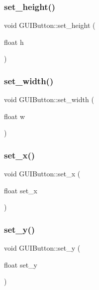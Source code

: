 \subsubsection{\texorpdfstring{set\+\_\+height()}{set\_height()}}
{\footnotesize\ttfamily void G\+U\+I\+Button\+::set\+\_\+height (\begin{DoxyParamCaption}\item[{float}]{h }\end{DoxyParamCaption})}

\hypertarget{class_g_u_i_button_ad712ea7ed6202c5916036d8f1e1a4460}{}\label{class_g_u_i_button_ad712ea7ed6202c5916036d8f1e1a4460} 
\subsubsection{\texorpdfstring{set\+\_\+width()}{set\_width()}}
{\footnotesize\ttfamily void G\+U\+I\+Button\+::set\+\_\+width (\begin{DoxyParamCaption}\item[{float}]{w }\end{DoxyParamCaption})}

\hypertarget{class_g_u_i_button_aba6aaca7c6c5b3b7747a7afd6750814e}{}\label{class_g_u_i_button_aba6aaca7c6c5b3b7747a7afd6750814e} 
\subsubsection{\texorpdfstring{set\+\_\+x()}{set\_x()}}
{\footnotesize\ttfamily void G\+U\+I\+Button\+::set\+\_\+x (\begin{DoxyParamCaption}\item[{float}]{set\+\_\+x }\end{DoxyParamCaption})}

\hypertarget{class_g_u_i_button_a80cdf26f1a5ab63b0d6f84145fe60411}{}\label{class_g_u_i_button_a80cdf26f1a5ab63b0d6f84145fe60411} 
\subsubsection{\texorpdfstring{set\+\_\+y()}{set\_y()}}
{\footnotesize\ttfamily void G\+U\+I\+Button\+::set\+\_\+y (\begin{DoxyParamCaption}\item[{float}]{set\+\_\+y }\end{DoxyParamCaption})}

